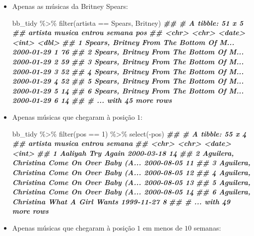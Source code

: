 \documentclass[
  11pt]{report}
\newenvironment{Shaded}{\begin{snugshade}}{\end{snugshade}}
\newcommand{\DecValTok}[1]{\textcolor[rgb]{0.00,0.00,0.81}{#1}}
\newcommand{\DocumentationTok}[1]{\textcolor[rgb]{0.56,0.35,0.01}{\textbf{\textit{#1}}}}
\newcommand{\FunctionTok}[1]{\textcolor[rgb]{0.00,0.00,0.00}{#1}}
\newcommand{\NormalTok}[1]{#1}
\newcommand{\SpecialCharTok}[1]{\textcolor[rgb]{0.00,0.00,0.00}{#1}}
\newcommand{\StringTok}[1]{\textcolor[rgb]{0.31,0.60,0.02}{#1}}
\renewenvironment{Shaded}{
    \begin{mdframed}[%
      roundcorner=2pt,%
      innerleftmargin=5pt,%
      innerrightmargin=5pt,%
      topline=true,%
      leftline=true,%
      rightline=true,%
      bottomline=true,%
      linewidth=0.5pt,%
      linecolor=black!20,%
      backgroundcolor=black!2,%
      skipabove=2ex,%
      skipbelow=2.5ex%
    ]%
  }
  {
    \end{mdframed}
  }
\begin{document}
\begin{itemize}
\item
  Apenas as músicas da Britney Spears:

\begin{Shaded}
\begin{Highlighting}[]
\NormalTok{bb\_tidy }\SpecialCharTok{\%\textgreater{}\%} 
  \FunctionTok{filter}\NormalTok{(artista }\SpecialCharTok{==} \StringTok{\textquotesingle{}Spears, Britney\textquotesingle{}}\NormalTok{)}
\DocumentationTok{\#\# \# A tibble: 51 x 5}
\DocumentationTok{\#\#   artista         musica                  entrou     semana   pos}
\DocumentationTok{\#\#   \textless{}chr\textgreater{}           \textless{}chr\textgreater{}                   \textless{}date\textgreater{}      \textless{}int\textgreater{} \textless{}dbl\textgreater{}}
\DocumentationTok{\#\# 1 Spears, Britney From The Bottom Of M... 2000{-}01{-}29      1    76}
\DocumentationTok{\#\# 2 Spears, Britney From The Bottom Of M... 2000{-}01{-}29      2    59}
\DocumentationTok{\#\# 3 Spears, Britney From The Bottom Of M... 2000{-}01{-}29      3    52}
\DocumentationTok{\#\# 4 Spears, Britney From The Bottom Of M... 2000{-}01{-}29      4    52}
\DocumentationTok{\#\# 5 Spears, Britney From The Bottom Of M... 2000{-}01{-}29      5    14}
\DocumentationTok{\#\# 6 Spears, Britney From The Bottom Of M... 2000{-}01{-}29      6    14}
\DocumentationTok{\#\# \# ... with 45 more rows}
\end{Highlighting}
\end{Shaded}
\item
  Apenas músicas que chegaram à posição $1$:

\begin{Shaded}
\begin{Highlighting}[]
\NormalTok{bb\_tidy }\SpecialCharTok{\%\textgreater{}\%} 
  \FunctionTok{filter}\NormalTok{(pos }\SpecialCharTok{==} \DecValTok{1}\NormalTok{) }\SpecialCharTok{\%\textgreater{}\%} 
  \FunctionTok{select}\NormalTok{(}\SpecialCharTok{{-}}\NormalTok{pos)}
\DocumentationTok{\#\# \# A tibble: 55 x 4}
\DocumentationTok{\#\#   artista             musica                  entrou     semana}
\DocumentationTok{\#\#   \textless{}chr\textgreater{}               \textless{}chr\textgreater{}                   \textless{}date\textgreater{}      \textless{}int\textgreater{}}
\DocumentationTok{\#\# 1 Aaliyah             Try Again               2000{-}03{-}18     14}
\DocumentationTok{\#\# 2 Aguilera, Christina Come On Over Baby (A... 2000{-}08{-}05     11}
\DocumentationTok{\#\# 3 Aguilera, Christina Come On Over Baby (A... 2000{-}08{-}05     12}
\DocumentationTok{\#\# 4 Aguilera, Christina Come On Over Baby (A... 2000{-}08{-}05     13}
\DocumentationTok{\#\# 5 Aguilera, Christina Come On Over Baby (A... 2000{-}08{-}05     14}
\DocumentationTok{\#\# 6 Aguilera, Christina What A Girl Wants       1999{-}11{-}27      8}
\DocumentationTok{\#\# \# ... with 49 more rows}
\end{Highlighting}
\end{Shaded}
\item
  Apenas músicas que chegaram à posição $1$ em menos de $10$ semanas:


\end{itemize}
\end{document}
